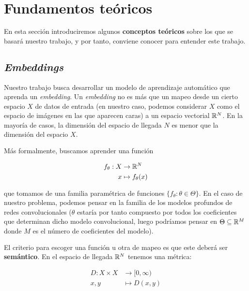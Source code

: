 \chapter{Fundamentos teóricos} \label{ich:fundamentos_teoricos}

En esta sección introduciremos algunos \textbf{conceptos teóricos} sobre los que se basará nuestro trabajo, y por tanto, conviene conocer para entender este trabajo.

\section{\textit{Embeddings}} \label{isec:embeddings}

Nuestro trabajo busca desarrollar un modelo de aprendizaje automático que aprenda un \textit{embedding}. Un \textit{embedding} no es más que un mapeo desde un cierto espacio $X$ de datos de entrada (en nuestro caso, podemos considerar $X$ como el espacio de imágenes en las que aparecen caras) a un espacio vectorial $\mathbb{R}^N$. En la mayoría de casos, la dimensión del espacio de llegada $N$ es menor que la dimensión del espacio $X$.

Más formalmente, buscamos aprender una función

\begin{equation}
\begin{split}
    f_{\theta}: X & \to \mathbb{R}^N \\
    x & \mapsto f_{\theta}(x)
\end{split}
\end{equation}

que tomamos de una familia paramétrica de funciones $\{f_{\theta}: \theta \in \Theta \}$. En el caso de nuestro problema, podemos pensar en la familia de los modelos profundos de redes convolucionales ($\theta$ estaría por tanto compuesto por todos los coeficientes que determinan dicho modelo convolucional, luego podríamos pensar en $\Theta \subseteq \mathbb{R}^M$ donde $M$ es el número de coeficientes del modelo).

El criterio para escoger una función u otra de mapeo es que este deberá ser \textbf{semántico}. En el espacio de llegada $\mathbb{R}^N$ tenemos una métrica:

\begin{equation}
\begin{split}
    D: X \times X & \to [0, \infty) \\
    x, y & \mapsto D(x, y)
\end{split}
\end{equation}

